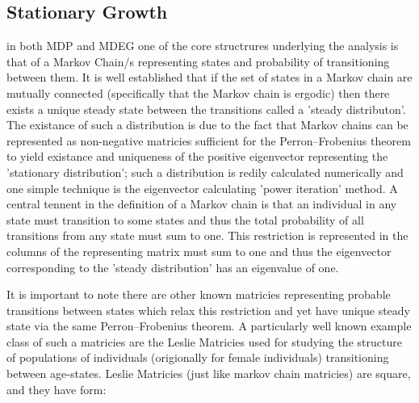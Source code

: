 \documentclass[journal,article,accept,oneauthors,pdftex,10pt,a4paper]{mdpi}
\begin{document}
\subsection{Stationary Growth}

in both MDP and MDEG one of the core structrures underlying the analysis is that of a Markov Chain/s representing states and probability of transitioning between them.
It is well established that if the set of states in a Markov chain are mutually connected (specifically that the Markov chain is ergodic) then there exists a unique steady state between the transitions called a 'steady distributon'.
The existance of such a distribution is due to the fact that Markov chains can be represented as non-negative matricies sufficient for the Perron–Frobenius theorem to yield existance and uniqueness of the positive eigenvector representing the 'stationary distribution'; such a distribution is redily calculated numerically and one simple technique is the eigenvector calculating 'power iteration' method.\cite{markov7}
A central tennent in the definition of a Markov chain is that an individual in any state must transition to some states and thus the total probability of all transitions from any state must sum to one.
This restriction is represented in the columns of the representing matrix must sum to one and thus the eigenvector corresponding to the 'steady distribution' has an eigenvalue of one.

It is important to note there are other known matricies representing probable transitions between states which relax this restriction and yet have unique steady state via the same Perron–Frobenius theorem.
A particularly well known example class of such a matricies are the Leslie Matricies used for studying the structure of populations of individuals (origionally for female individuals) transitioning between age-states.
Leslie Matricies (just like markov chain matricies) are square, and they have form:\cite{leslie}
\end{document}
